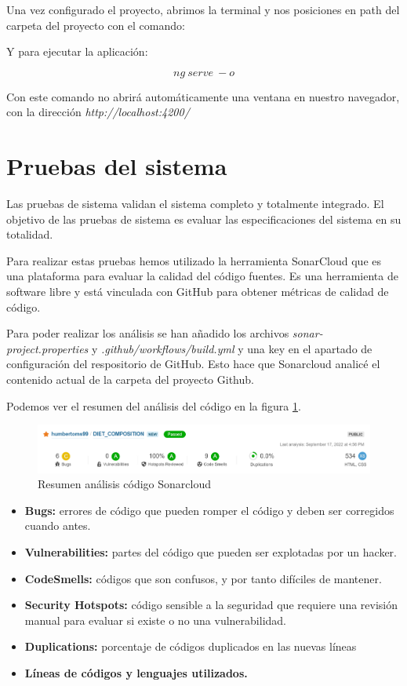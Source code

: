 Una vez configurado el proyecto, abrimos la terminal y nos posiciones en path del carpeta del proyecto con el comando:



Y para ejecutar la aplicación:

$$ ng\:serve\:-o $$

Con este comando no abrirá automáticamente una ventana en nuestro navegador, con la dirección \textit{http://localhost:4200/} 



\section{Pruebas del sistema}

Las pruebas de sistema validan el sistema completo y totalmente integrado. El objetivo de las pruebas de sistema es evaluar las especificaciones del sistema en su totalidad.

Para realizar estas pruebas hemos utilizado la herramienta SonarCloud que es una plataforma para evaluar la calidad del código fuentes. Es una herramienta de software libre y está vinculada con GitHub para obtener métricas de calidad de código.

Para poder realizar los análisis se han añadido los archivos \textit{sonar-project.properties} y \textit{.github/workflows/build.yml} y una key en el apartado de configuración del respositorio de GitHub. Esto hace que Sonarcloud analicé el contenido actual de la carpeta del proyecto Github.

Podemos ver el resumen del análisis del código en la figura \ref{fig:sonarcloud_res}. 

\begin{figure}[h!] 
\centering
    \includegraphics[width=1\textwidth]{img/sonarcloud_res_1.PNG}
\caption{Resumen análisis código Sonarcloud}
\label{fig:sonarcloud_res}
\end{figure}

\begin{itemize}
    \item \textbf{Bugs:} errores de código que pueden romper el código y deben ser corregidos cuando antes. 
    \item \textbf{Vulnerabilities:} partes del código que pueden ser explotadas por un hacker.
    \item \textbf{CodeSmells: } códigos que son confusos, y por tanto difíciles de mantener.
    \item \textbf{Security Hotspots: } código sensible a la seguridad que requiere una revisión manual para evaluar si existe o no una vulnerabilidad.
    \item \textbf{Duplications:} porcentaje de códigos duplicados en las nuevas líneas
    \item \textbf{Líneas de códigos y lenguajes utilizados.}
\end{itemize}


